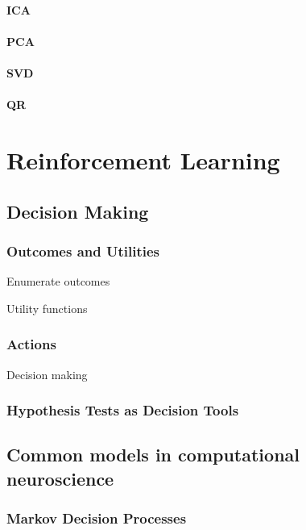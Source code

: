 \documentclass[]{article}
\begin{document}
\subsection{ICA}

\subsection{PCA}

\subsection{SVD}

\subsection{QR}

\part{Reinforcement Learning}

\chapter{Decision Making}

\section{Outcomes and Utilities}

Enumerate outcomes

Utility functions

\section{Actions}

Decision making

\section{Hypothesis Tests as Decision Tools}

\chapter{Common models in computational neuroscience}

\section{Markov Decision Processes}
\end{document}
